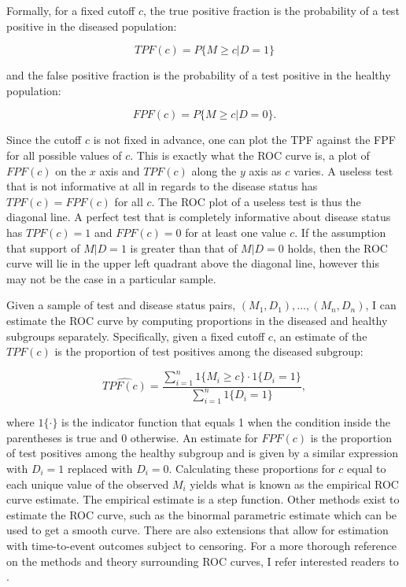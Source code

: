 \documentclass[codesnippet]{jss}
\begin{document}
Formally, for a fixed cutoff \(c\), the true positive fraction is the
probability of a test positive in the diseased population:

\[ TPF(c) = P\{ M \geq c | D = 1 \} \]

and the false positive fraction is the probability of a test positive in
the healthy population:

\[ FPF(c) = P\{ M \geq c | D = 0 \}. \]

Since the cutoff \(c\) is not fixed in advance, one can plot the TPF
against the FPF for all possible values of \(c\). This is exactly what
the ROC curve is, a plot of \(FPF(c)\) on the \(x\) axis and \(TPF(c)\)
along the \(y\) axis as \(c\) varies. A useless test that is not
informative at all in regards to the disease status has
\(TPF(c) = FPF(c)\) for all \(c\). The ROC plot of a useless test is
thus the diagonal line. A perfect test that is completely informative
about disease status has \(TPF(c) = 1\) and \(FPF(c) = 0\) for at least
one value \(c\). If the assumption that support of \(M | D = 1\) is
greater than that of \(M | D = 0\) holds, then the ROC curve will lie in
the upper left quadrant above the diagonal line, however this may not be
the case in a particular sample.

Given a sample of test and disease status pairs,
\((M_1, D_1), \ldots, (M_n, D_n)\), I can estimate the ROC curve by
computing proportions in the diseased and healthy subgroups separately.
Specifically, given a fixed cutoff \(c\), an estimate of the \(TPF(c)\)
is the proportion of test positives among the diseased subgroup:

\[ \widehat{TPF(c)} = \frac{\sum_{i = 1}^n 1\{M_i \geq c\} \cdot 1\{D_i = 1\}}{\sum_{i=1}^n 1\{D_i = 1\}}, \]

where \(1\{\cdot\}\) is the indicator function that equals 1 when the
condition inside the parentheses is true and 0 otherwise. An estimate
for \(FPF(c)\) is the proportion of test positives among the healthy
subgroup and is given by a similar expression with \(D_i = 1\) replaced
with \(D_i = 0\). Calculating these proportions for \(c\) equal to each
unique value of the observed \(M_i\) yields what is known as the
empirical ROC curve estimate. The empirical estimate is a step function.
Other methods exist to estimate the ROC curve, such as the binormal
parametric estimate which can be used to get a smooth curve. There are
also extensions that allow for estimation with time-to-event outcomes
subject to censoring. For a more thorough reference on the methods and
theory surrounding ROC curves, I refer interested readers to
\citet{pepe2003statistical}.
\end{document}
